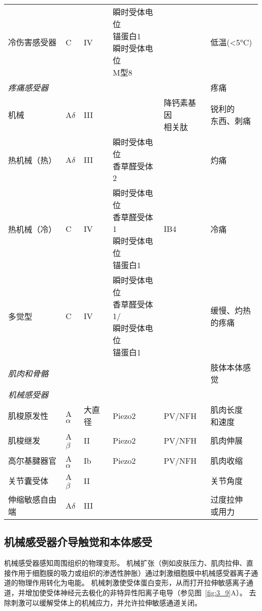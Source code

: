 \begin{table}[htbp]
\begin{tabular}{llllll}
		冷伤害感受器 & C & IV & \makecell[l]{瞬时受体电位\\锚蛋白1\\瞬时受体电位\\M型8} &  & 低温(<5°C) \\
		\textit{疼痛感受器} &  &  & &  & 疼痛 \\
		机械 & A$\delta$ & III & & \makecell{降钙素基因\\相关肽} & \makecell[l]{锐利的\\东西、刺痛} \\
		热机械（热） & A$\delta$ & III & \makecell[l]{瞬时受体电位\\香草醛受体2} &  & 灼痛 \\
		热机械（冷） & C & IV & \makecell[l]{瞬时受体电位\\香草醛受体1\\瞬时受体电位\\锚蛋白1} & IB4 & 冷痛 \\
		多觉型 & C & IV & \makecell[l]{瞬时受体电位\\香草醛受体1/\\瞬时受体电位\\锚蛋白1} &  & \makecell[l]{缓慢、灼热\\的疼痛} \\
		\textit{肌肉和骨骼} &  &  &  &  & 肢体本体感觉 \\
		\textit{机械感受器} &  &  &  &  &  \\
		肌梭原发性 & A$\alpha$ & 大直径 & Piezo2 & PV/NFH & \makecell[l]{肌肉长度\\和速度} \\
		肌梭继发 & A$\beta$ & II & Piezo2 & PV/NFH & 肌肉伸展 \\
		高尔基腱器官 & A$\alpha$ & Ib & Piezo2 & PV/NFH & 肌肉收缩 \\
		关节囊受体 & A$\beta$ & II &  &  & 关节角度 \\
		伸缩敏感自由端 & A$\delta$ & III &  &  & \makecell[l]{过度拉伸\\或用力} \\
		\bottomrule
	\end{tabular}
\end{table}


\subsection{机械感受器介导触觉和本体感受}

机械感受器感知周围组织的物理变形。
机械扩张（例如皮肤压力、肌肉拉伸、直接作用于细胞膜的吸力或组织的渗透性肿胀）通过刺激细胞膜中机械感受器离子通道的物理作用转化为电能。
机械刺激使受体蛋白变形，从而打开拉伸敏感离子通道，并增加使受体神经元去极化的非特异性阳离子电导（参见图~\ref{fig:3_9}A）。
去除刺激可以缓解受体上的机械应力，并允许拉伸敏感通道关闭。


